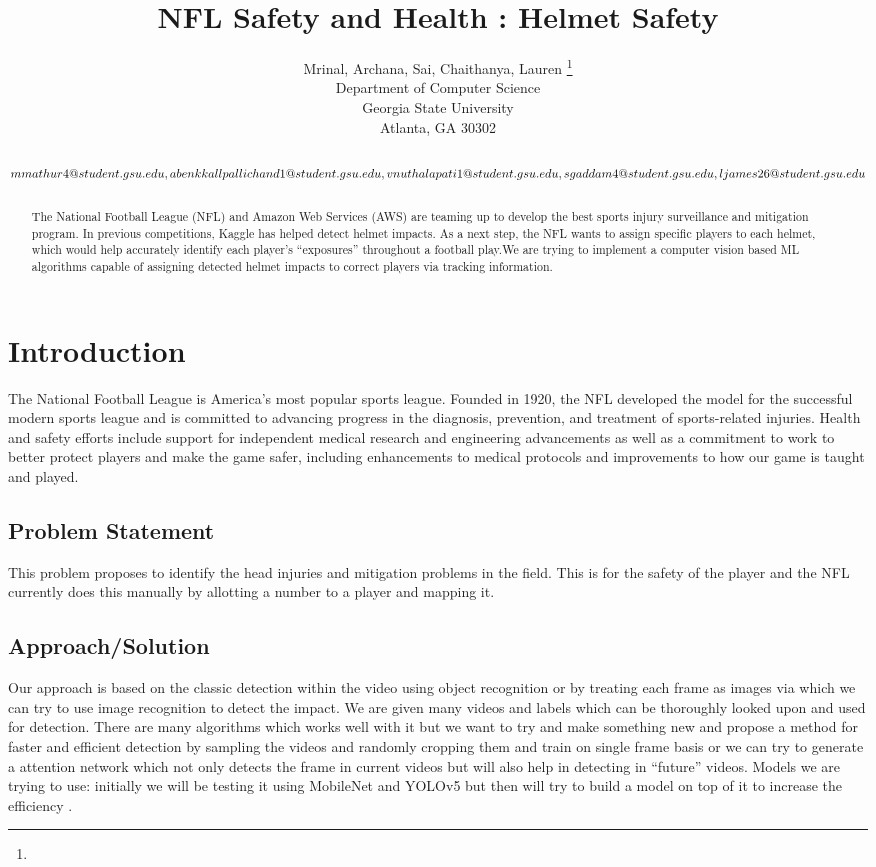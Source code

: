 \documentclass{article}
\title{NFL Safety and Health : Helmet Safety}
\author{%
  Mrinal, Archana, Sai, Chaithanya, Lauren
  \thanks{} \\
  Department of Computer Science\\
  Georgia State University\\
 Atlanta, GA 30302 \\ \\
 $$mmathur4@student.gsu.edu,\\
  abenkkallpallichand1@student.gsu.edu,\\
  vnuthalapati1@student.gsu.edu,\\
  sgaddam4@student.gsu.edu,\\
  ljames26@student.gsu.edu$$ 
}
\begin{document}
\maketitle
\begin{abstract}
The National Football League (NFL) and Amazon Web Services (AWS) are teaming up to develop the best sports injury surveillance and mitigation program. In previous competitions, Kaggle has helped detect helmet impacts. As a next step, the NFL wants to assign specific players to each helmet, which would help accurately identify each player's “exposures” throughout a football play.We are trying to implement a computer vision based ML algorithms capable of assigning detected helmet impacts to correct players via tracking information.
\end{abstract}
\section{Introduction}
The National Football League is America's most popular sports league. Founded in 1920, the NFL developed the model for the successful modern sports league and is committed to advancing progress in the diagnosis, prevention, and treatment of sports-related injuries. Health and safety efforts include support for independent medical research and engineering advancements as well as a commitment to work to better protect players and make the game safer, including enhancements to medical protocols and improvements to how our game is taught and played.

\subsection{Problem Statement}
This problem proposes to identify the head injuries and mitigation problems in the field. This is for the safety of the player and the NFL currently does this manually by allotting a number to a player and mapping it.

\subsection{Approach/Solution}
Our approach is based on the classic detection within the video using object recognition or by treating each frame as images via which we can try to use image recognition to detect the impact. We are given many videos and labels which can be thoroughly looked upon and used for detection.
There are many algorithms which works well with it but we want to try and make something new and propose a method for faster and efficient detection by sampling the videos and randomly cropping them and train on single frame basis or we can try to generate a attention network which not only detects the frame in current videos but will also help in detecting in “future” videos.
Models we are trying to use: initially we will be testing it using MobileNet and YOLOv5 but then will try to build a model on top of it to increase the efficiency .
\end{document}
